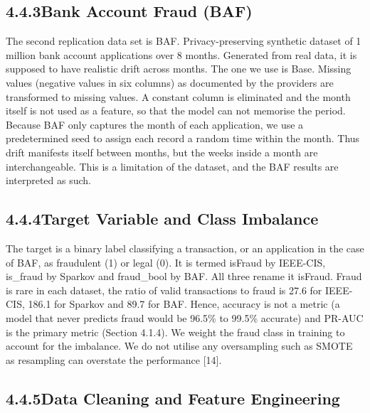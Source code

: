 \documentclass[11pt,letterpaper]{report}
\begin{document}
\subsection*{4.4.3\quad Bank Account Fraud (BAF)}

The second replication data set is BAF. Privacy-preserving synthetic dataset of 1 million bank account applications over 8 months. Generated from real data, it is supposed to have realistic drift across months. The one we use is Base. Missing values (negative values in six columns) as documented by the providers are transformed to missing values. A constant column is eliminated and the month itself is not used as a feature, so that the model can not memorise the period. Because BAF only captures the month of each application, we use a predetermined seed to assign each record a random time within the month. Thus drift manifests itself between months, but the weeks inside a month are interchangeable. This is a limitation of the dataset, and the BAF results are interpreted as such.

\subsection*{4.4.4\quad Target Variable and Class Imbalance}

The target is a binary label classifying a transaction, or an application in the case of BAF, as fraudulent (1) or legal (0). It is termed isFraud by IEEE-CIS, is\_fraud by Sparkov and fraud\_bool by BAF. All three rename it isFraud. Fraud is rare in each dataset, the ratio of valid transactions to fraud is 27.6 for IEEE-CIS, 186.1 for Sparkov and 89.7 for BAF. Hence, accuracy is not a metric (a model that never predicts fraud would be 96.5\% to 99.5\% accurate) and PR-AUC is the primary metric (Section 4.1.4). We weight the fraud class in training to account for the imbalance. We do not utilise any oversampling such as SMOTE as resampling can overstate the performance [14].

\subsection*{4.4.5\quad Data Cleaning and Feature Engineering}
\end{document}
